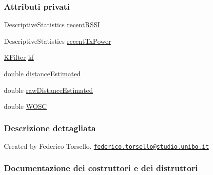 \subsubsection*{Attributi privati}
\begin{DoxyCompactItemize}
\item 
Descriptive\+Statistics \hyperlink{classit_1_1unibo_1_1torsello_1_1bluetoothpositioning_1_1distanceEstimation_1_1Estimation_a4edd1c580372b087a9d8fc167715088a_a4edd1c580372b087a9d8fc167715088a}{recent\+R\+S\+SI}
\item 
Descriptive\+Statistics \hyperlink{classit_1_1unibo_1_1torsello_1_1bluetoothpositioning_1_1distanceEstimation_1_1Estimation_a4258d96e807fa104223635ecb7ddc940_a4258d96e807fa104223635ecb7ddc940}{recent\+Tx\+Power}
\item 
\hyperlink{classit_1_1unibo_1_1torsello_1_1bluetoothpositioning_1_1kalmanFilter_1_1KFilter}{K\+Filter} \hyperlink{classit_1_1unibo_1_1torsello_1_1bluetoothpositioning_1_1distanceEstimation_1_1Estimation_a93af801219b710f3a048e7db1c7a8982_a93af801219b710f3a048e7db1c7a8982}{kf}
\item 
double \hyperlink{classit_1_1unibo_1_1torsello_1_1bluetoothpositioning_1_1distanceEstimation_1_1Estimation_a7a5514b25ac6495842a53e54319be10d_a7a5514b25ac6495842a53e54319be10d}{distance\+Estimated}
\item 
double \hyperlink{classit_1_1unibo_1_1torsello_1_1bluetoothpositioning_1_1distanceEstimation_1_1Estimation_a5afcd0b9b73a92b64669f060206f35db_a5afcd0b9b73a92b64669f060206f35db}{raw\+Distance\+Estimated}
\item 
double \hyperlink{classit_1_1unibo_1_1torsello_1_1bluetoothpositioning_1_1distanceEstimation_1_1Estimation_a53237b14bc1d27ae4f751b02d798b595_a53237b14bc1d27ae4f751b02d798b595}{W\+O\+SC}
\end{DoxyCompactItemize}


\subsubsection{Descrizione dettagliata}
Created by Federico Torsello. \href{mailto:federico.torsello@studio.unibo.it}{\tt federico.\+torsello@studio.\+unibo.\+it} 

\subsubsection{Documentazione dei costruttori e dei distruttori}
\hypertarget{classit_1_1unibo_1_1torsello_1_1bluetoothpositioning_1_1distanceEstimation_1_1Estimation_abd84ded1e26d40304606ce0572735106_abd84ded1e26d40304606ce0572735106}{}\label{classit_1_1unibo_1_1torsello_1_1bluetoothpositioning_1_1distanceEstimation_1_1Estimation_abd84ded1e26d40304606ce0572735106_abd84ded1e26d40304606ce0572735106} 
